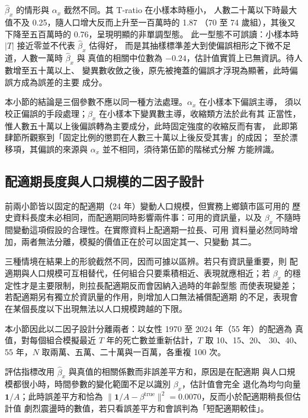 \documentclass[UTF8, fontset=macnew, a4paper, 12pt]{ctexart}
\begin{document}
$\hat\beta_x$ 的情形與 $\alpha_x$ 截然不同。其 T-ratio 在小樣本時極小，
人數二十萬以下時最大值不及 0.25，隨人口增大反而上升至一百萬時的 1.87
（70 至 74 歲組），其後又下降至五百萬時的 0.76，呈現明顯的非單調型態。
此一型態不可誤讀：小樣本時 $|T|$ 接近零並不代表 $\hat\beta_x$ 估得好，
而是其抽樣標準差大到使偏誤相形之下微不足道，人數一萬時 $\hat\beta_x$ 與
真值的相關中位數為 $-0.24$，估計值實質上已無資訊。待人數增至五十萬以上、
變異數收斂之後，原先被掩蓋的偏誤才浮現為顯著，此時偏誤方成為誤差的主要
成分。

本小節的結論是三個參數不應以同一種方法處理。$\alpha_x$ 在小樣本下偏誤主導，
須以校正偏誤的手段處理；$\beta_x$ 在小樣本下變異數主導，收縮類方法於此有其
正當性，惟人數五十萬以上後偏誤轉為主要成分，此時固定強度的收縮反而有害，
此即第肆節所觀察到「固定比例的懲罰在人數三十萬以上後反受其害」的成因；
至於漂移項，其偏誤的來源與 $\alpha_x$ 並不相同，須待第伍節的階梯式分解
方能辨識。

\subsection{配適期長度與人口規模的二因子設計}\label{sec:TN}

前兩小節皆以固定的配適期（24 年）變動人口規模，但實務上鄉鎮市區可用的
歷史資料長度未必相同，而配適期同時影響兩件事：可用的資訊量，以及
$\beta_x$ 不隨時間變動這項假設的合理性。在實際資料上配適期一拉長、可用
資料量必然同時增加，兩者無法分離，模擬的價值正在於可以固定其一、只變動
其二。

三種情境在結果上的形貌截然不同，因而可據以區辨。若只有資訊量重要，則
配適期與人口規模可互相替代，任何組合只要乘積相近、表現就應相近；若
$\beta_x$ 的穩定性才是主要限制，則拉長配適期反而會因納入過時的年齡型態
而使表現變差；若配適期另有獨立於資訊量的作用，則增加人口無法補償配適期
的不足，表現會在某個長度以下出現無法以人口規模跨越的下限。

本小節因此以二因子設計分離兩者：以女性 1970 至 2024 年（55 年）的配適為
真值，對每個組合模擬最近 $T$ 年的死亡數並重新估計，$T$ 取 10、15、20、
30、40、55 年，$N$ 取兩萬、五萬、二十萬與一百萬，各重複 100 次。

評估指標改用 $\hat\beta_x$ 與真值的相關係數而非誤差平方和，原因是在配適期
與人口規模都很小時，時間參數的變化範圍不足以識別 $\beta_x$，估計值會完全
退化為均勻向量 $\mathbf{1}/A$；此時誤差平方和恰為
$\|\mathbf{1}/A-\beta^{\text{true}}\|^2=0.0070$，反而小於配適期稍長但估計值
劇烈震盪時的數值，若只看誤差平方和會誤判為「短配適期較佳」。
\end{document}

